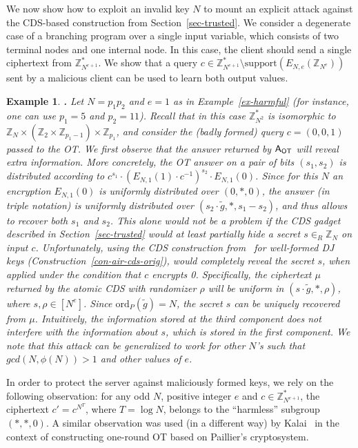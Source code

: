 \documentclass[11pt]{article}
\newcommand{\order}{{\mathrm{ord}}}
\newcommand{\ansot}{{\sf A_{OT}}}
\newcommand{\encr}[2]{E_{#1}(#2)}
\newcommand{\encdj}{{E}_{N,e}}
\newcommand{\support}{{\mathrm{support}}}
\newcommand{\Z}{{\mathbb{Z}}}
\newtheorem{EXAMPLE}{Example}[section]
\newenvironment{example}{\begin{EXAMPLE} \hspace{-.85em} {\bf .} \rm}%
	{\end{EXAMPLE}}
\newcommand{\ot}{\mbox{OT}\;}
\newcommand{\otns}{\mbox{OT}}
\newcommand{\U}[1]{\mathbb{Z}_{#1}^*}
\begin{document}
We now show how to exploit an invalid key $N$ to mount an explicit
attack against the CDS-based construction from
Section~\ref{sec-trusted}.
We consider a degenerate case of a branching program over a single
input variable, which consists of two terminal nodes and one
internal node. In this case, the client should send a single
ciphertext from $\U{N^{e+1}}$. We show that a query
$c\in\U{N^{e+1}}\setminus\support(\encdj(\Z_{N^e}))$ sent by a
malicious client can be used to learn both output values.
\begin{example}
\label{ex-fullymal-attack} Let $N=p_1p_2$ and $e=1$ as in
Example~\ref{ex-harmful} (for instance, one can use $p_1=5$ and
$p_2=11$). Recall that in this case $\U{N^2}$ is isomorphic to
$\Z_N\times (\Z_2\times\Z_{p_1-1})\times \Z_{p_1}$, and consider
the (badly formed) query $c=(0,0,1)$ passed to the \otns. We first
observe that the answer returned by $\ansot$ will reveal extra
information. More concretely, the OT answer on a pair of bits
$(s_1,s_2)$ is distributed according to
$c^{s_1}\cdot(\encr{N,1}{1}\cdot c^{-1})^{s_2}\cdot \encr{N,1}{0}$.
Since for this $N$ an encryption $\encr{N,1}{0}$ is uniformly
distributed over $(0,*,0)$, the answer (in triple notation) is
uniformly distributed over $(s_2\cdot \tilde{g},*,s_1-s_2)$, and
thus allows to recover both $s_1$ and $s_2$. This alone would not be
a problem if the CDS gadget described in Section~\ref{sec-trusted}
would at least partially hide a secret $s\in_R\Z_N$ on input $c$. Unfortunately, using the CDS
construction from~\cite{AIR01} for well-formed DJ keys (Construction~\ref{con-air-cds-orig}),
would completely reveal the secret $s$, when applied under
the condition that $c$ encrypts 0. Specifically, the ciphertext
$\mu$ returned by the atomic CDS with randomizer $\rho$ will be
uniform in $(s\cdot \tilde{g},*,\rho)$, where $s,\rho\in[N^e]$.
Since $\order_P(\tilde{g})=N$,  the secret $s$ can be uniquely
recovered from $\mu$. Intuitively, the information stored at the
third component does not interfere with the information about $s$, which is stored in the first component. We note that this attack can be generalized to work for
other $N$'s such that $gcd(N,\phi(N))>1$ and other values of $e$.
\end{example}

In order to protect the server against maliciously formed keys, we
rely on the following observation: for any odd $N$, positive
integer $e$ and $c\in \U{N^{e+1}}$, the ciphertext $c'=c^{N^T}$,
where $T=\log N$, belongs to the ``harmless'' subgroup $(*,*,0)$. A
similar observation was used (in a different way) by
Kalai~\cite{T05} in the context of constructing one-round OT based
on Paillier's cryptosystem.
\end{document}
